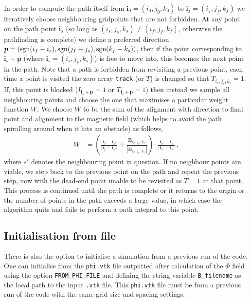 \documentclass[notitlepage,aps,amsmath,amssymb,11pt]{revtex4-1}
\newcommand{\rndb}[1]{\left( #1 \right)}
\newcommand{\norm}[1]{\left| #1 \right|}
\renewcommand{\vec}[1]{\boldsymbol{#1}}
\begin{document}
In order to compute the path itself from $\vec{i}_0 = (i_0, j_0, k_0)$ to $\vec{i}_f = (i_f,j_f,k_f)$ we iteratively choose neighbouring gridpoints that are not forbidden. At any point on the path point $\vec{i}_s$ (so long as $(i_s,j_s,k_s) \neq (i_f,j_f,k_f)$, otherwise the pathfinding is complete) we define a preferred direction $\vec{p} = ({\rm sgn}(i_f-i_s),{\rm sgn}(j_f-j_s),{\rm sgn}(k_f-k_s))$, then if the point corresponding to $\vec{i}_s+\vec{p}$ (where $\vec{i}_s=(i_s,j_s,k_s)$) is free to move into, this becomes the next point in the path. Note that a path is forbidden from revisiting a previous point, each time a point is visited the zero array \verb'track' (or $T$) is changed so that  $T_{i_s,j_s,k_s} = 1$. If, this point is blocked ($I_{\vec{i}_s+\vec{p}}=1$ or $T_{\vec{i}_s+\vec{p}}=1$) then instead we sample all neighbouring points and choose the one that maximises a particular weight function $W$. We choose $W$ to be the sum of the alignment with direction to final point and alignment to the magnetic field (which helps to avoid the path spiralling around when it hits an obstacle) as follows,
\begin{align}
W &= \rndb{ \frac{\vec{i}_f-\vec{i}_{s'}}{\norm{\vec{i}_f-\vec{i}_{s'}}} + \frac{\vec{B}_{i_{s'},j_{s'},k_{s'}}}{\norm{\vec{B}_{i_{s'},j_{s'},k_{s'}}}} }\cdot \frac{\vec{i}_{s'}-\vec{i}_{s}}{\norm{\vec{i}_{s'}-\vec{i}_{s}}} \, ,
\end{align}
where $s'$ denotes the neighbouring point in question. If no neighbour points are viable, we step back to the previous point on the path and repeat the previous step, now with the dead-end point unable to be revisited as $T = 1$ at that point. This process is continued until the path is complete or it returns to the origin or the number of points in the path exceeds a large value, in which case the algorithm quits and fails to perform a path integral to this point.

\subsection{Initialisation from file}

There is also the option to initialise a simulation from a previous run of the code. One can initialise from the \verb'phi.vtk' file outputted after calculation of the $\Phi$ field using the option \verb'FROM_PHI_FILE' and defining the string variable \verb'B_filename' as the local path to the input \verb'.vtk' file. This \verb'phi.vtk' file must be from a previous run of the code with the same grid size and spacing settings. 
\end{document}
